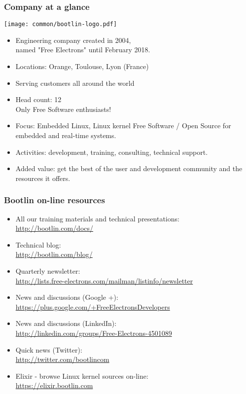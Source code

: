 \begin{frame}
\frametitle{Company at a glance}
  \texttt{[image: common/bootlin-logo.pdf]}
  \begin{itemize}
    \item Engineering company created in 2004,\\
          named "Free Electrons" until February 2018.
    \item Locations: Orange, Toulouse, Lyon (France)
    \item Serving customers all around the world
    \item Head count: 12 \\
	  Only Free Software enthusiasts!
    \item Focus: Embedded Linux, Linux kernel
          Free Software / Open Source
          for embedded and real-time systems.
    \item Activities: development, training, consulting, technical
          support.
    \item Added value: get the best of the user and development
          community and the resources it offers.
  \end{itemize}
\end{frame}

\begin{frame}
\frametitle{Bootlin on-line resources}
  \begin{itemize}
    \item All our training materials and technical presentations:\\
          \url{http://bootlin.com/docs/}
    \item Technical blog:\\
          \url{http://bootlin.com/blog/}
    \item Quarterly newsletter:\\
 	  \url{http://lists.free-electrons.com/mailman/listinfo/newsletter}
    \item News and discussions (Google +):\\
	  \url{https://plus.google.com/+FreeElectronsDevelopers}
    \item News and discussions (LinkedIn):\\
	  \url{http://linkedin.com/groups/Free-Electrons-4501089}
    \item Quick news (Twitter):\\
          \url{http://twitter.com/bootlincom}
    \item Elixir - browse Linux kernel sources on-line:\\
          \url{https://elixir.bootlin.com}
  \end{itemize}
\end{frame}

